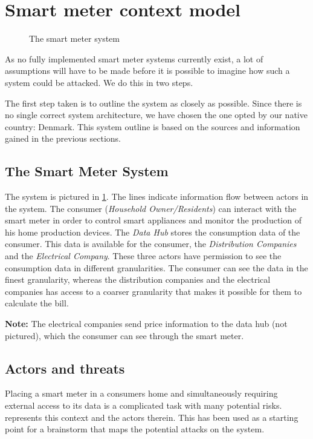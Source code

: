 \section{Smart meter context model}\label{sec:smartmetercontext}

\begin{figure}[h]
  \centering
  
  \caption{The smart meter system\cite{tdlm}}
  \label{contextual:system}
\end{figure}

As no fully implemented smart meter systems currently exist, a lot of assumptions will have to be made before it is possible to imagine how such a system could be attacked.
We do this in two steps.

The first step taken is to outline the system as closely as possible.
Since there is no single correct system architecture, we have chosen the one opted by our native country: Denmark.
This system outline is based on the sources and information gained in the previous sections.

\subsection{The Smart Meter System}
The system is pictured in \cref{contextual:system}.
The lines indicate information flow between actors in the system.
The consumer (\textit{Household Owner/Residents}) can interact with the smart meter in order to control smart appliances and monitor the production of his home production devices.
The \textit{Data Hub} stores the consumption data of the consumer.
This data is available for the consumer, the \textit{Distribution Companies} and the \textit{Electrical Company}.
These three actors have permission to see the consumption data in different granularities.
The consumer can see the data in the finest granularity, whereas the distribution companies and the electrical companies has access to a coarser granularity that makes it possible for them to calculate the bill.

\textbf{Note:} The electrical companies send price information to the data hub (not pictured), which the consumer can see through the smart meter.

\subsection{Actors and threats}
Placing a smart meter in a consumers home and simultaneously requiring external access to its data is a complicated task with many potential risks.
 represents this context and the actors therein.
This has been used as a starting point for a brainstorm that maps the potential attacks on the system.


